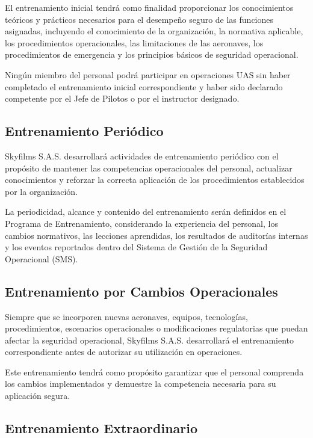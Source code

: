 El entrenamiento inicial tendrá como finalidad proporcionar los conocimientos teóricos y prácticos necesarios para el desempeño seguro de las funciones asignadas, incluyendo el conocimiento de la organización, la normativa aplicable, los procedimientos operacionales, las limitaciones de las aeronaves, los procedimientos de emergencia y los principios básicos de seguridad operacional.

Ningún miembro del personal podrá participar en operaciones UAS sin haber completado el entrenamiento inicial correspondiente y haber sido declarado competente por el Jefe de Pilotos o por el instructor designado.

\subsection{Entrenamiento Periódico}

Skyfilms S.A.S. desarrollará actividades de entrenamiento periódico con el propósito de mantener las competencias operacionales del personal, actualizar conocimientos y reforzar la correcta aplicación de los procedimientos establecidos por la organización.

La periodicidad, alcance y contenido del entrenamiento serán definidos en el Programa de Entrenamiento, considerando la experiencia del personal, los cambios normativos, las lecciones aprendidas, los resultados de auditorías internas y los eventos reportados dentro del Sistema de Gestión de la Seguridad Operacional (SMS).

\subsection{Entrenamiento por Cambios Operacionales}

Siempre que se incorporen nuevas aeronaves, equipos, tecnologías, procedimientos, escenarios operacionales o modificaciones regulatorias que puedan afectar la seguridad operacional, Skyfilms S.A.S. desarrollará el entrenamiento correspondiente antes de autorizar su utilización en operaciones.

Este entrenamiento tendrá como propósito garantizar que el personal comprenda los cambios implementados y demuestre la competencia necesaria para su aplicación segura.

\subsection{Entrenamiento Extraordinario}

